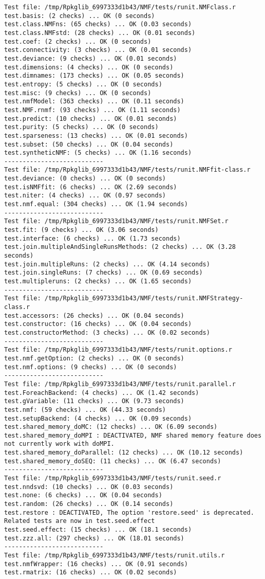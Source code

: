 \documentclass[10pt]{article}\usepackage[]{graphicx}\usepackage[]{color}
\begin{document}
\begin{verbatim}
Test file: /tmp/Rpkglib_6997333d1b43/NMF/tests/runit.NMFclass.r 
test.basis: (2 checks) ... OK (0 seconds)
test.class.NMFns: (65 checks) ... OK (0.03 seconds)
test.class.NMFstd: (28 checks) ... OK (0.01 seconds)
test.coef: (2 checks) ... OK (0 seconds)
test.connectivity: (3 checks) ... OK (0.01 seconds)
test.deviance: (9 checks) ... OK (0.01 seconds)
test.dimensions: (4 checks) ... OK (0 seconds)
test.dimnames: (173 checks) ... OK (0.05 seconds)
test.entropy: (5 checks) ... OK (0 seconds)
test.misc: (9 checks) ... OK (0 seconds)
test.nmfModel: (363 checks) ... OK (0.11 seconds)
test.NMF.rnmf: (93 checks) ... OK (1.11 seconds)
test.predict: (10 checks) ... OK (0.01 seconds)
test.purity: (5 checks) ... OK (0 seconds)
test.sparseness: (13 checks) ... OK (0.01 seconds)
test.subset: (50 checks) ... OK (0.04 seconds)
test.syntheticNMF: (5 checks) ... OK (1.16 seconds)
--------------------------- 
Test file: /tmp/Rpkglib_6997333d1b43/NMF/tests/runit.NMFfit-class.r 
test.deviance: (0 checks) ... OK (0 seconds)
test.isNMFfit: (6 checks) ... OK (2.69 seconds)
test.niter: (4 checks) ... OK (0.97 seconds)
test.nmf.equal: (304 checks) ... OK (1.94 seconds)
--------------------------- 
Test file: /tmp/Rpkglib_6997333d1b43/NMF/tests/runit.NMFSet.r 
test.fit: (9 checks) ... OK (3.06 seconds)
test.interface: (6 checks) ... OK (1.73 seconds)
test.join.multipleAndSingleRunsMethods: (2 checks) ... OK (3.28 seconds)
test.join.multipleRuns: (2 checks) ... OK (4.14 seconds)
test.join.singleRuns: (7 checks) ... OK (0.69 seconds)
test.multipleruns: (2 checks) ... OK (1.65 seconds)
--------------------------- 
Test file: /tmp/Rpkglib_6997333d1b43/NMF/tests/runit.NMFStrategy-class.r 
test.accessors: (26 checks) ... OK (0.04 seconds)
test.constructor: (16 checks) ... OK (0.04 seconds)
test.constructorMethod: (3 checks) ... OK (0.02 seconds)
--------------------------- 
Test file: /tmp/Rpkglib_6997333d1b43/NMF/tests/runit.options.r 
test.nmf.getOption: (2 checks) ... OK (0 seconds)
test.nmf.options: (9 checks) ... OK (0 seconds)
--------------------------- 
Test file: /tmp/Rpkglib_6997333d1b43/NMF/tests/runit.parallel.r 
test.ForeachBackend: (4 checks) ... OK (1.42 seconds)
test.gVariable: (11 checks) ... OK (9.73 seconds)
test.nmf: (59 checks) ... OK (44.33 seconds)
test.setupBackend: (4 checks) ... OK (0.09 seconds)
test.shared_memory_doMC: (12 checks) ... OK (6.09 seconds)
test.shared_memory_doMPI : DEACTIVATED, NMF shared memory feature does not currently work with doMPI.
test.shared_memory_doParallel: (12 checks) ... OK (10.12 seconds)
test.shared_memory_doSEQ: (11 checks) ... OK (6.47 seconds)
--------------------------- 
Test file: /tmp/Rpkglib_6997333d1b43/NMF/tests/runit.seed.r 
test.nndsvd: (10 checks) ... OK (0.03 seconds)
test.none: (6 checks) ... OK (0.04 seconds)
test.random: (26 checks) ... OK (0.14 seconds)
test.restore : DEACTIVATED, The option 'restore.seed' is deprecated. Related tests are now in test.seed.effect
test.seed.effect: (15 checks) ... OK (18.1 seconds)
test.zzz.all: (297 checks) ... OK (18.01 seconds)
--------------------------- 
Test file: /tmp/Rpkglib_6997333d1b43/NMF/tests/runit.utils.r 
test.nmfWrapper: (16 checks) ... OK (0.91 seconds)
test.rmatrix: (16 checks) ... OK (0.02 seconds)


\end{verbatim}
\end{document}
